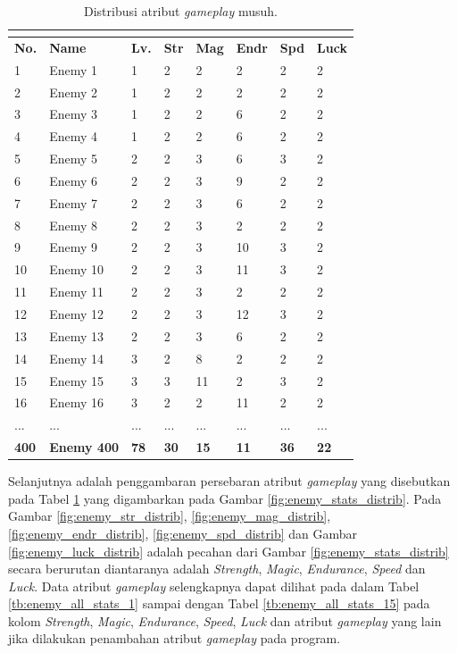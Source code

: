 \begin{longtable}{|l|l|l|l|l|l|l|l|}
	\caption{Distribusi atribut \textit{gameplay} musuh.}
	\vspace{1ex}
	\label{tb:enemy_stats}\\
	\hline
	\rowcolor[HTML]{C0C0C0} 
	\textbf{No.} & \textbf{Name} & \textbf{Lv.} & \textbf{Str} & \textbf{Mag} & \textbf{Endr} & \textbf{Spd} & \textbf{Luck} \\ \hline
	1 & Enemy 1 & 1 & 2 & 2 & 2 & 2 & 2 \\ \hline
	2 & Enemy 2 & 1 & 2 & 2 & 2 & 2 & 2 \\ \hline
	3 & Enemy 3 & 1 & 2 & 2 & 6 & 2 & 2 \\ \hline
	4 & Enemy 4 & 1 & 2 & 2 & 6 & 2 & 2 \\ \hline
	5 & Enemy 5 & 2 & 2 & 3 & 6 & 3 & 2 \\ \hline
	6 & Enemy 6 & 2 & 2 & 3 & 9 & 2 & 2 \\ \hline
	7 & Enemy 7 & 2 & 2 & 3 & 6 & 2 & 2 \\ \hline
	8 & Enemy 8 & 2 & 2 & 3 & 2 & 2 & 2 \\ \hline
	9 & Enemy 9 & 2 & 2 & 3 & 10 & 3 & 2 \\ \hline
	10 & Enemy 10 & 2 & 2 & 3 & 11 & 3 & 2 \\ \hline
	11 & Enemy 11 & 2 & 2 & 3 & 2 & 2 & 2 \\ \hline
	12 & Enemy 12 & 2 & 2 & 3 & 12 & 3 & 2 \\ \hline
	13 & Enemy 13 & 2 & 2 & 3 & 6 & 2 & 2 \\ \hline
	14 & Enemy 14 & 3 & 2 & 8 & 2 & 2 & 2 \\ \hline
	15 & Enemy 15 & 3 & 3 & 11 & 2 & 3 & 2 \\ \hline
	16 & Enemy 16 & 3 & 2 & 2 & 11 & 2 & 2 \\ \hline
	... & ... & ... & ... & ... & ... & ... & ... \\ \hline
	\textbf{400} & \textbf{Enemy 400} & \textbf{78} & \textbf{30} & \textbf{15} & \textbf{11} & \textbf{36} & \textbf{22} \\ \hline
\end{longtable}
\vspace{1ex}

Selanjutnya adalah penggambaran persebaran atribut \textit{gameplay} yang disebutkan pada Tabel \ref{tb:enemy_stats} yang digambarkan pada Gambar \ref{fig:enemy_stats_distrib}. Pada Gambar \ref{fig:enemy_str_distrib}, \ref{fig:enemy_mag_distrib}, \ref{fig:enemy_endr_distrib}, \ref{fig:enemy_spd_distrib} dan Gambar \ref{fig:enemy_luck_distrib} adalah pecahan dari Gambar \ref{fig:enemy_stats_distrib} secara berurutan diantaranya adalah \textit{Strength}, \textit{Magic}, \textit{Endurance}, \textit{Speed} dan \textit{Luck}. Data atribut \textit{gameplay} selengkapnya dapat dilihat pada  dalam Tabel \ref{tb:enemy_all_stats_1} sampai dengan Tabel \ref{tb:enemy_all_stats_15} pada kolom \textit{Strength}, \textit{Magic}, \textit{Endurance}, \textit{Speed}, \textit{Luck} dan atribut \textit{gameplay} yang lain jika dilakukan penambahan atribut \textit{gameplay} pada program. 
\clearpage

